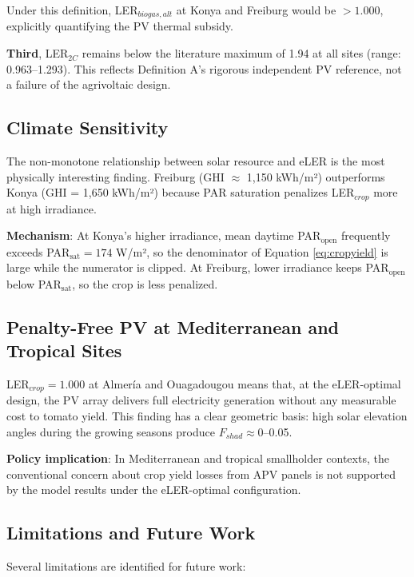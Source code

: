 \documentclass[12pt, a4paper]{article}
\begin{document}
Under this definition, LER$_{biogas,alt}$ at Konya and Freiburg would be $>1.000$, explicitly quantifying the PV thermal subsidy.

\textbf{Third}, LER$_{2C}$ remains below the literature maximum of 1.94 at all sites (range: 0.963–1.293). This reflects Definition A's rigorous independent PV reference, not a failure of the agrivoltaic design.

\subsection{Climate Sensitivity}

\hspace{1cm}The non-monotone relationship between solar resource and eLER is the most physically interesting finding. Freiburg (GHI $\approx$ 1,150 kWh/m²) outperforms Konya (GHI = 1,650 kWh/m²) because PAR saturation penalizes LER$_{crop}$ more at high irradiance.

\textbf{Mechanism}: At Konya's higher irradiance, mean daytime PAR$_{\text{open}}$ frequently exceeds PAR$_{\text{sat}} = 174$ W/m², so the denominator of Equation \ref{eq:cropyield} is large while the numerator is clipped. At Freiburg, lower irradiance keeps PAR$_{\text{open}}$ below PAR$_{\text{sat}}$, so the crop is less penalized.

\subsection{Penalty-Free PV at Mediterranean and Tropical Sites}

LER$_{crop} = 1.000$ at Almería and Ouagadougou means that, at the eLER-optimal design, the PV array delivers full electricity generation without any measurable cost to tomato yield. This finding has a clear geometric basis: high solar elevation angles during the growing seasons produce $F_{shad} \approx 0$–0.05.

\textbf{Policy implication}: In Mediterranean and tropical smallholder contexts, the conventional concern about crop yield losses from APV panels is not supported by the model results under the eLER-optimal configuration.

\subsection{Limitations and Future Work}

\hspace{1cm}Several limitations are identified for future work:
\end{document}
